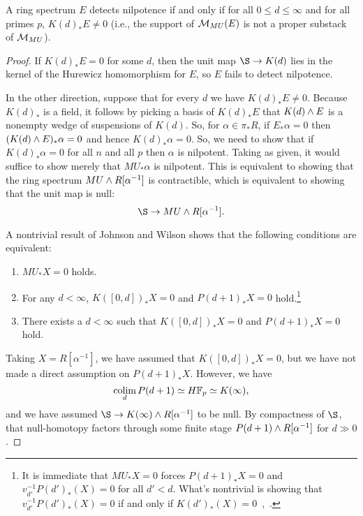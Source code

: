 \begin{corollary}\label{LocalNilpotenceDetection}
A ring spectrum \(E\) detects nilpotence if and only if for all \(0 \le d \le \infty\) and for all primes \(p\), \(K(d)_* E \ne 0\) (i.e., the support of \(\mathcal{M}_{MU}(E)\) is not a proper substack of \(\mathcal{M}_{MU}\)).
\end{corollary}
\begin{proof}
If \(K(d)_* E = 0\) for some \(d\), then the unit map \(\S \to K(d)\) lies in the kernel of the Hurewicz homomorphism for \(E\), so \(E\) fails to detect nilpotence.

In the other direction, suppose that for every \(d\) we have \(K(d)_* E \ne 0\).  Because \(K(d)_*\) is a field, it follows by picking a basis of \(K(d)_* E\) that \(K(d) \wedge E\) is a nonempty wedge of suspensions of \(K(d)\).  So, for \(\alpha \in \pi_* R\), if \(E_* \alpha = 0\) then \((K(d) \wedge E)_* \alpha = 0\) and hence \(K(d)_* \alpha = 0\).  So, we need to show that if \(K(d)_* \alpha = 0\) for all \(n\) and all \(p\) then \(\alpha\) is nilpotent.  Taking  as given, it would suffice to show merely that \(MU_* \alpha\) is nilpotent.  This is equivalent to showing that the ring spectrum \(MU \wedge R[\alpha^{-1}]\) is contractible, which is equivalent to showing that the unit map is null: \[\S \to MU \sm R[\alpha^{-1}].\]

A nontrivial result of Johnson and Wilson shows that the following conditions are equivalent:
\begin{enumerate}
    \item \(MU_* X = 0\) holds.
    \item For any \(d < \infty\), \(K([0, d])_* X = 0\) and \(P(d+1)_* X = 0\) hold.\footnote{It is immediate that \(MU_* X = 0\) forces \(P(d+1)_* X = 0\) and \(v_{d'}^{-1} P(d')_*(X) = 0\) for all \(d' < d\).  What's nontrivial is showing that \(v_{d'}^{-1} P(d')_*(X) = 0\) if and only if \(K(d')_*(X) = 0\)~\cite[Theorem 2.1.a]{RavenelLocalizationWRTPeriodic},~\cite[Section 3]{JohnsonWilson}.}
    \item There exists a \(d < \infty\) such that \(K([0, d])_* X = 0\) and \(P(d+1)_* X = 0\) hold.
\end{enumerate}
Taking \(X = R[\alpha^{-1}]\), we have assumed that \(K([0, d])_* X = 0\), but we have not made a direct assumption on \(P(d+1)_* X\).  However, we have \[\colim_d P(d+1) \simeq \HFp \simeq K(\infty),\] and we have assumed \(\S \to K(\infty) \sm R[\alpha^{-1}]\) to be null.  By compactness of \(\S\), that null-homotopy factors through some finite stage \(P(d+1) \wedge R[\alpha^{-1}]\) for \(d \gg 0\).
\end{proof}

